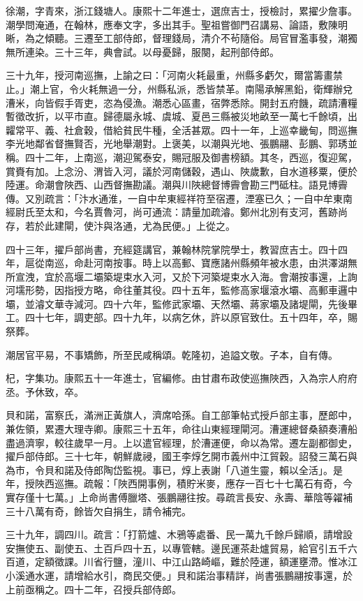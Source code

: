 \begin{pinyinscope}
徐潮，字青來，浙江錢塘人。康熙十二年進士，選庶吉士，授檢討，累擢少詹事。潮學問淹通，在翰林，應奉文字，多出其手。聖祖嘗御門召講易、論語，敷陳明晰，為之傾聽。三遷至工部侍郎，督理錢局，清介不茍隨俗。局官冒濫事發，潮獨無所連染。三十三年，典會試。以母憂歸，服闋，起刑部侍郎。

三十九年，授河南巡撫，上諭之曰：「河南火耗最重，州縣多虧欠，爾當籌畫禁止。」潮上官，令火耗無過一分，州縣私派，悉皆禁革。南陽承解黑鉛，衛輝辦兌漕米，向皆假手胥吏，恣為侵漁。潮悉心區畫，宿弊悉除。開封五府饑，疏請漕糧暫徵改折，以平市直。歸德屬永城、虞城、夏邑三縣被災地畝至一萬七千餘頃，出糶常平、義、社倉穀，借給貧民牛種，全活甚眾。四十一年，上巡幸畿甸，問巡撫李光地鄰省督撫賢否，光地舉潮對。上褒美，以潮與光地、張鵬翮、彭鵬、郭琇並稱。四十二年，上南巡，潮迎駕泰安，賜冠服及御書榜額。其冬，西巡，復迎駕，賞賚有加。上念汾、渭皆入河，議於河南儲穀，遇山、陜歲歉，自水道移粟，便於陸運。命潮會陜西、山西督撫勘議。潮與川陜總督博霽會勘三門砥柱。語見博霽傳。又別疏言：「汴水通淮，一自中牟東經祥符至宿遷，湮塞已久；一自中牟東南經尉氏至太和，今名賈魯河，尚可通流：請量加疏濬。鄭州北別有支河，舊跡尚存，若於此建閘，使汴與洛通，尤為民便。」上從之。

四十三年，擢戶部尚書，充經筵講官，兼翰林院掌院學士，教習庶吉士。四十四年，扈從南巡，命赴河南按事。時上以高郵、寶應諸州縣頻年被水患，由洪澤湖無所宣洩，宜於高堰二壩築堤束水入河，又於下河築堤束水入海。會潮按事還，上詢河壖形勢，因指授方略，命往董其役。四十五年，監修高家堰滾水壩、高郵車邏中壩，並濬文華寺減河。四十六年，監修武家壩、天然壩、蔣家壩及諸堤閘，先後畢工。四十七年，調吏部。四十九年，以病乞休，許以原官致仕。五十四年，卒，賜祭葬。

潮居官平易，不事矯飾，所至民咸稱頌。乾隆初，追謚文敬。子本，自有傳。

杞，字集功。康熙五十一年進士，官編修。由甘肅布政使巡撫陜西，入為宗人府府丞。予休致，卒。

貝和諾，富察氏，滿洲正黃旗人，濟席哈孫。自工部筆帖式授戶部主事，歷郎中，兼佐領，累遷大理寺卿。康熙三十五年，命往山東經理閘河。漕運總督桑額奏漕船盡過濟寧，較往歲早一月。上以遣官經理，於漕運便，命以為常。遷左副都御史，擢戶部侍郎。三十七年，朝鮮歲祲，國王李焞乞開市義州中江貿穀。詔發三萬石與為市，令貝和諾及侍郎陶岱監視。事已，焞上表謝「八道生靈，賴以全活」。是年，授陜西巡撫。疏報：「陜西開事例，積貯米麥，應存一百七十七萬石有奇，今實存僅十七萬。」上命尚書傅臘塔、張鵬翮往按。尋疏言長安、永壽、華陰等糴補三十八萬有奇，餘皆欠自捐生，請令補完。

三十九年，調四川。疏言：「打箭爐、木鴉等處番、民一萬九千餘戶歸順，請增設安撫使五、副使五、土百戶四十五，以專管轄。邊民運茶赴爐貿易，給官引五千六百道，定額徵課。川省行鹽，潼川、中江山路崎嶇，難於陸運，額運壅滯。惟冰江小溪通水運，請增給水引，商民交便。」貝和諾治事精詳，尚書張鵬翮按事還，於上前亟稱之。四十二年，召授兵部侍郎。


\end{pinyinscope}
